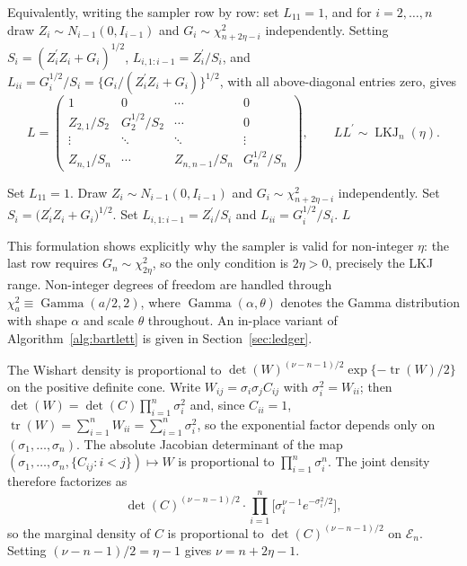\documentclass[12pt,english]{article}
\makeatletter
\theoremstyle{plain} %
\theoremstyle{definition} %
\theoremstyle{remark} %
\renewenvironment{proof}[1][\proofname]{\par
  \pushQED{\qed}%
  \normalfont \topsep6\p@\@plus6\p@\relax
  \trivlist
  \item[\hskip\labelsep\bfseries#1:]\ignorespaces
}{%
  \popQED\endtrivlist\@endpefalse
}
\makeatother
\begin{document}
Equivalently, writing the sampler row by row: set $L_{11}=1$, and for $i=2,\ldots,n$ draw $Z_i\sim N_{i-1}(0,I_{i-1})$ and $G_i\sim\chi^2_{n+2\eta-i}$ independently. Setting $S_i=(Z_i^\prime Z_i+G_i)^{1/2}$, $L_{i,1:i-1}=Z_i^\prime/S_i$, and $L_{ii}=G_i^{1/2}/S_i=\{G_i/(Z_i^\prime Z_i+G_i)\}^{1/2}$, with all above-diagonal entries zero, gives
$$
L=\begin{pmatrix}
1 & 0 & \cdots & 0\\
Z_{2,1}/S_2 & G_2^{1/2}/S_2 & \cdots & 0\\
\vdots & \ddots & \ddots & \vdots\\
Z_{n,1}/S_n  & \cdots & Z_{n,n-1}/S_n & G_n^{1/2}/S_n
\end{pmatrix},
\qquad
LL^\prime\sim\operatorname{LKJ}_n(\eta).
$$

\begin{algorithm}[H]
\caption{Normalized-Bartlett $\operatorname{LKJ}_n(\eta)$ Cholesky sampler}
\label{alg:bartlett}
\begin{algorithmic}[1]
\State Set $L_{11}=1$.
  \State Draw $Z_i\sim N_{i-1}(0,I_{i-1})$ and $G_i\sim\chi^2_{n+2\eta-i}$ independently.
  \State Set $S_i=\bigl(Z_i^\prime Z_i+G_i\bigr)^{1/2}$.
  \State Set $L_{i,1:i-1}=Z_i^\prime/S_i$ and $L_{ii}=G_i^{1/2}/S_i$.
\EndFor
\State \Return $L$ 
\end{algorithmic}
\end{algorithm}

This formulation shows explicitly why the sampler is valid for non-integer $\eta$: the last row requires $G_n\sim\chi^2_{2\eta}$, so the only condition is $2\eta>0$, precisely the LKJ range. Non-integer degrees of freedom are handled through $\chi^2_a\equiv\operatorname{Gamma}(a/2,2)$, where $\operatorname{Gamma}(\alpha,\theta)$ denotes the Gamma distribution with shape $\alpha$ and scale $\theta$ throughout. An in-place variant of Algorithm~\ref{alg:bartlett} is given in Section~\ref{sec:ledger}.

\begin{proof}[Proof of Proposition~\ref{prop:lkj_wishart}]
The Wishart density is proportional to $\det(W)^{(\nu-n-1)/2}\allowbreak\exp\{-\operatorname{tr}(W)/2\}$ on the positive definite cone. Write $W_{ij}=\sigma_i\sigma_j C_{ij}$ with $\sigma_i^2=W_{ii}$; then $\det(W)=\det(C)\prod_{i=1}^n\sigma_i^2$ and, since $C_{ii}=1$, $\operatorname{tr}(W)=\sum_{i=1}^n W_{ii}=\sum_{i=1}^n\sigma_i^2$, so the exponential factor depends only on $(\sigma_1,\ldots,\sigma_n)$. The absolute Jacobian determinant of the map $(\sigma_1,\ldots,\sigma_n,\{C_{ij}:i<j\})\mapsto W$ is proportional to $\prod_{i=1}^n\sigma_i^{n}$. The joint density therefore factorizes as
$$
\det(C)^{(\nu-n-1)/2}\cdot\prod_{i=1}^n\bigl[\sigma_i^{\nu-1}e^{-\sigma_i^2/2}\bigr],
$$
so the marginal density of $C$ is proportional to $\det(C)^{(\nu-n-1)/2}$ on $\mathcal{E}_n$. Setting $(\nu-n-1)/2=\eta-1$ gives $\nu=n+2\eta-1$.
\end{proof}
\end{document}
